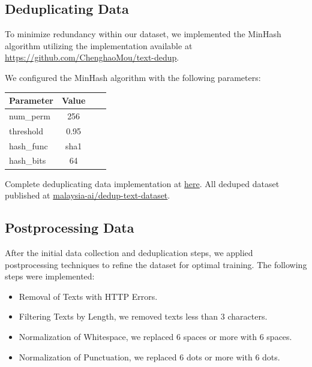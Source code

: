 \documentclass{article}
\begin{document}
\subsection{Deduplicating Data}

To minimize redundancy within our dataset, we implemented the MinHash algorithm utilizing the implementation available at \url{https://github.com/ChenghaoMou/text-dedup}.

We configured the MinHash algorithm with the following parameters:

\begin{table}[h]
  \centering
  \begin{tabular}{lccl}
    \hline
    \textbf{Parameter} & \textbf{Value} \\
    \hline
    num\_perm          & 256            \\
    threshold          & 0.95           \\
    hash\_func         & sha1           \\
    hash\_bits         & 64             \\
    \hline
  \end{tabular}
\end{table}

Complete deduplicating data implementation at \href{https://github.com/malaysia-ai/dedup-text-dataset?tab=readme-ov-file#text-dedup}{here}. All deduped dataset published at \href{https://huggingface.co/datasets/malaysia-ai/dedup-text-dataset}{malaysia-ai/dedup-text-dataset}.

\subsection{Postprocessing Data}

After the initial data collection and deduplication steps, we applied postprocessing techniques to refine the dataset for optimal training. The following steps were implemented:

\begin{itemize}
  \item Removal of Texts with HTTP Errors.

  \item Filtering Texts by Length, we removed texts less than 3 characters.

  \item Normalization of Whitespace, we replaced 6 spaces or more with 6 spaces.

  \item Normalization of Punctuation, we replaced 6 dots or more with 6 dots.
\end{itemize}
\end{document}
